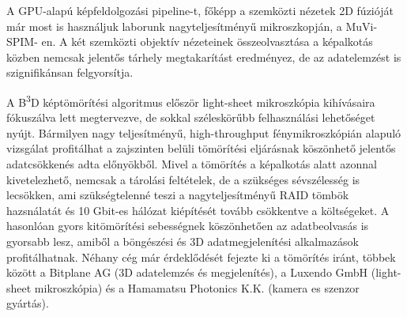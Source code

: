 \documentclass{booklet_style}
\def\b3d{B\textsuperscript{3}D}
\begin{document}
A GPU-alapú képfeldolgozási pipeline-t, főképp a szemközti nézetek 2D fúzióját már most is használjuk laborunk nagyteljesítményű mikroszkopján, a MuVi-SPIM- en. A két szemközti objektív nézeteinek összeolvasztása a képalkotás közben nemcsak jelentős tárhely megtakarítást eredményez, de az adatelemzést is szignifikánsan felgyorsítja.

A \b3d képtömörítési algoritmus először light-sheet mikroszkópia kihívásaira fókuszálva lett megtervezve, de sokkal széleskörűbb felhasználási lehetőséget nyújt. Bármilyen nagy teljesítményű, high-throughput fénymikroszkópián alapuló vizsgálat profitálhat a zajszinten belüli tömörítési eljárásnak köszönhető jelentős adatcsökkenés adta előnyökből. Mivel a tömörítés a képalkotás alatt azonnal kivetelezhető, nemcsak a tárolási feltételek, de a szükséges sévszélesség is lecsökken, ami szükségtelenné teszi a nagyteljesítményű RAID tömbök hazsnálatát és 10 Gbit-es hálózat kiépítését tovább csökkentve a költségeket. A hasonlóan gyors kitömörítési sebességnek köszönhetően az
adatbeolvasás is gyorsabb lesz, amiből a böngészési és 3D adatmegjelenítési alkalmazások profitálhatnak. Néhany cég már érdeklődését fejezte ki a tömörítés iránt, többek között a Bitplane AG (3D adatelemzés és megjelenítés), a Luxendo GmbH (light-sheet mikroszkópia) és a Hamamatsu Photonics K.K. (kamera es szenzor gyártás).





\printbibliography[category=journal, title={A szerző közleményei a témában}, heading=secbib]

\nocite{jakus_genetic_2010,gyorffy_recurrenceonline:_2011,shi_combined_2014}
\printbibliography[category=others, title={A szerző további közleményei}, heading=secbib, resetnumbers=5]

\printbibliography[category=conference, title={A szerző konferencia előadásai}, heading=secbib]

\newrefcontext
\printbibliography[notcategory=journal,notcategory=conference,notcategory=others, resetnumbers=true, title={Refernciák}, heading=secbib]


\end{document}
